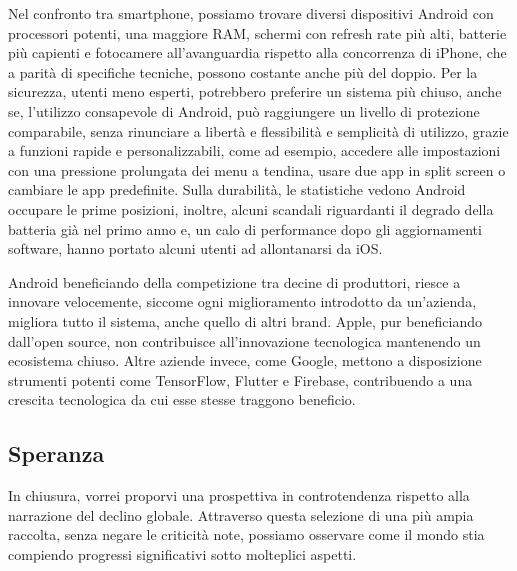 \documentclass[12pt]{book} %
\begin{document}
\begin{mdframed}[linewidth=1pt]
Nel confronto tra smartphone, possiamo trovare diversi dispositivi Android con processori potenti, una maggiore RAM, schermi con refresh rate più alti, batterie più capienti e fotocamere all’avanguardia rispetto alla concorrenza di iPhone, che a parità di specifiche tecniche, possono costante anche più del doppio. Per la sicurezza, utenti meno esperti, potrebbero preferire un sistema più chiuso, anche se, l'utilizzo consapevole di Android, può raggiungere un livello di protezione comparabile, senza rinunciare a libertà e flessibilità e semplicità di utilizzo, grazie a funzioni rapide e personalizzabili, come ad esempio, accedere alle impostazioni con una pressione prolungata dei menu a tendina, usare due app in split screen o cambiare le app predefinite. Sulla durabilità, le statistiche vedono Android occupare le prime posizioni, inoltre, alcuni scandali riguardanti il degrado della batteria già nel primo anno e, un calo di performance dopo gli aggiornamenti software, hanno portato alcuni utenti ad allontanarsi da iOS. 

Android beneficiando della competizione tra decine di produttori, riesce a innovare velocemente, siccome ogni miglioramento introdotto da un’azienda, migliora tutto il sistema, anche quello di altri brand. Apple, pur beneficiando dall'open source, non contribuisce all'innovazione tecnologica mantenendo un ecosistema chiuso. Altre aziende invece, come Google, mettono a disposizione strumenti potenti come TensorFlow, Flutter e Firebase, contribuendo a una crescita tecnologica da cui esse stesse traggono beneficio.
\end{mdframed}

\subsection{Speranza}

In chiusura, vorrei proporvi una prospettiva in controtendenza rispetto alla narrazione del declino globale. Attraverso questa selezione di una più ampia raccolta, senza negare le criticità note, possiamo osservare come il mondo stia compiendo progressi significativi sotto molteplici aspetti.
\end{document}
